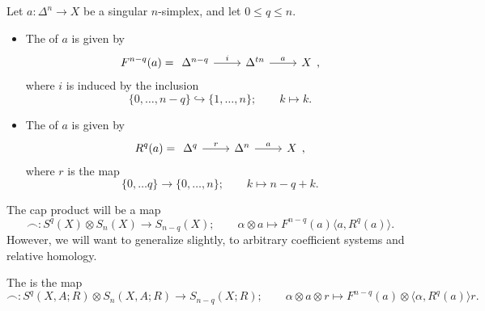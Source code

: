 \documentclass[main.tex]{subfiles}
\begin{document}
\begin{definition}
  \label{def:front_rear_face}
  Let $a\colon \Delta^{n} \to X$ be a singular $n$-simplex, and let $0 \leq q \leq n$.
  \begin{itemize}
    \item The  of $a$ is given by
      \begin{equation*}
        F^{n-q}(a) =
        \begin{tikzcd}
          \Delta^{n-q}
          \arrow[r, "i"]
          & \Delta^{tn}
          \arrow[r, "a"]
          & X
        \end{tikzcd},
      \end{equation*}
      where $i$ is induced by the inclusion
      \begin{equation*}
        \{0, \ldots, n-q\} \hookrightarrow \{1, \ldots, n \};\qquad k \mapsto k.
      \end{equation*}

    \item The  of $a$ is given by
      \begin{equation*}
        R^{q}(a) =
        \begin{tikzcd}
          \Delta^{q}
          \arrow[r, "r"]
          & \Delta^{n}
          \arrow[r, "a"]
          & X
        \end{tikzcd},
      \end{equation*}
      where $r$ is the map
      \begin{equation*}
        \{0, \ldots q\} \to \{0, \ldots, n\};\qquad k \mapsto n-q+k.
      \end{equation*}
  \end{itemize}
\end{definition}

The cap product will be a map
\begin{equation*}
  \frown\colon S^{q}(X) \otimes S_{n}(X) \to S_{n-q}(X);\qquad \alpha \otimes a \mapsto F^{n-q}(a)\langle a, R^{q}(a) \rangle.
\end{equation*}
However, we will want to generalize slightly, to arbitrary coefficient systems and relative homology.

\begin{definition}
  \label{def:cap_product}
  The  is the map
  \begin{equation*}
    \frown\colon S^{q}(X, A; R) \otimes S_{n}(X, A; R) \to S_{n-q}(X; R); \qquad \alpha \otimes a \otimes r \mapsto F^{n-q}(a) \otimes \langle \alpha, R^{q}(a) \rangle r.
  \end{equation*}
\end{definition}
\end{document}

